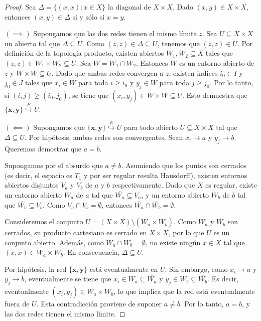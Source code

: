\documentclass{article}
\theoremstyle{plain}
\theoremstyle{definition}
\newcommand{\cl}[1]{\overline{#1}}              %
\newcommand{\evto}[1]{\stackrel{E}{\hookrightarrow} #1}   %
\begin{document}
\begin{proof}
    Sea \( \Delta = \{ (x, x) : x \in X \} \) la diagonal de \( X \times X \). Dado \( (x, y) \in X \times X \), entonces \( (x, y) \in \Delta \) si y sólo si \( x = y \).

    \( (\implies) \) Supongamos que las dos redes tienen el mismo límite \( z \). Sea \( U \subseteq X \times X \) un abierto tal que \( \Delta \subseteq U \). Como \( (z, z) \in \Delta \subseteq U \), tenemos que \( (z, z) \in U \).
    Por definición de la topología producto, existen abiertos \( W_1, W_2 \subseteq X \) tales que \( (z, z) \in W_1 \times W_2 \subseteq U \). Sea \( W = W_1 \cap W_2 \). Entonces \( W \) es un entorno abierto de \( z \) y \( W \times W \subseteq U \).
    Dado que ambas redes convergen a \( z \), existen índices \( i_0 \in I \) y \( j_0 \in J \) tales que \( x_i \in W \) para toda \( i \geq i_0 \) y \( y_j \in W \) para toda \( j \geq j_0 \). Por lo tanto, si \( (i, j) \geq (i_0, j_0) \), se tiene que \( (x_i, y_j) \in W \times W \subseteq U \). Esto demuestra que \( \{\mathbf{x}, \mathbf{y}\} \evto{U} \).

    \( (\impliedby) \) Supongamos que \( \{\mathbf{x}, \mathbf{y}\} \evto{U} \) para todo abierto \( U \subseteq X \times X \) tal que \( \Delta \subseteq U \). Por hipótesis, ambas redes son convergentes. Sean \( x_i \to a \) y \( y_j \to b \). Queremos demostrar que \( a = b \).

    Supongamos por el absurdo que \( a \neq b \). Asumiendo que los puntos son cerrados (es decir, el espacio es \( T_1 \) y por ser regular resulta Hausdorff), existen entornos abiertos disjuntos \( V_a \) y \( V_b \) de \( a \) y \( b \) respectivamente.
    Dado que \( X \) es regular, existe un entorno abierto \( W_a \) de \( a \) tal que \( \cl{W_a} \subseteq V_a \), y un entorno abierto \( W_b \) de \( b \) tal que \( \cl{W_b} \subseteq V_b \). Como \( V_a \cap V_b = \emptyset \), entonces \( \cl{W_a} \cap \cl{W_b} = \emptyset \).

    Consideremos el conjunto \( U = (X \times X) \setminus (\cl{W_a} \times \cl{W_b}) \). Como \( \cl{W_a} \) y \( \cl{W_b} \) son cerrados, su producto cartesiano es cerrado en \( X \times X \), por lo que \( U \) es un conjunto abierto.
    Además, como \( \cl{W_a} \cap \cl{W_b} = \emptyset \), no existe ningún \( x \in X \) tal que \( (x, x) \in \cl{W_a} \times \cl{W_b} \). En consecuencia, \( \Delta \subseteq U \).

    Por hipótesis, la red \( \{\mathbf{x}, \mathbf{y}\} \) está eventualmente en \( U \). Sin embargo, como \( x_i \to a \) y \( y_j \to b \), eventualmente se tiene que \( x_i \in W_a \subseteq \cl{W_a} \) y \( y_j \in W_b \subseteq \cl{W_b} \). Es decir, eventualmente \( (x_i, y_j) \in \cl{W_a} \times \cl{W_b} \), lo que implica que la red está eventualmente fuera de \( U \).
    Esta contradicción proviene de suponer \( a \neq b \). Por lo tanto, \( a = b \), y las dos redes tienen el mismo límite.
\end{proof}
\end{document}
